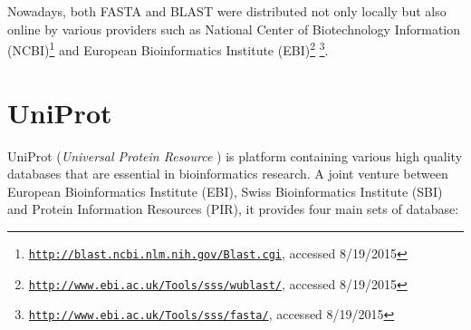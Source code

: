 Nowadays, both FASTA and BLAST were distributed not only locally but also online by various providers such as National Center of Biotechnology Information (NCBI)\footnote{\href{http://blast.ncbi.nlm.nih.gov/Blast.cgi}{\texttt{http://blast.ncbi.nlm.nih.gov/Blast.cgi}}, accessed 8/19/2015} and European Bioinformatics Institute (EBI)\footnote{\href{http://www.ebi.ac.uk/Tools/sss/wublast/}{\texttt{http://www.ebi.ac.uk/Tools/sss/wublast/}}, accessed 8/19/2015} \footnote{\href{http://www.ebi.ac.uk/Tools/sss/fasta/}{\texttt{http://www.ebi.ac.uk/Tools/sss/fasta/}}, accessed 8/19/2015}.


\section{UniProt}

UniProt (\textit{Universal Protein Resource} \citep{uniprot2008universal}) is platform containing various high quality databases that are essential in bioinformatics research. A joint venture between European Bioinformatics Institute (EBI), Swiss Bioinformatics Institute (SBI) and Protein Information Resources (PIR), it provides four main sets of database: 

